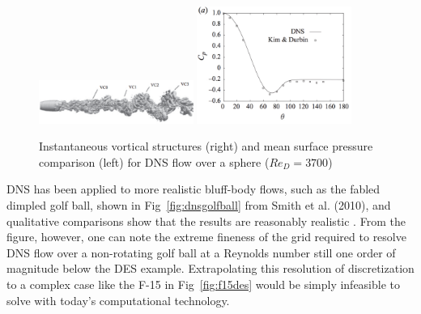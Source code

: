 \documentclass[journal]{new-aiaa}
\begin{document}
\begin{figure}[H]
\begin{center}
\includegraphics[width=0.45\textwidth]{Images/logan/rodriguez2011direct_DNSsphereWake.pdf}
\includegraphics[width=0.45\textwidth]{Images/logan/rodriguez2011direct_DNSsphereCp.pdf}
\caption{ Instantaneous vortical structures (right) and mean surface pressure comparison (left) for DNS flow over a sphere ($Re_D = 3700$) \cite{rodriguez2011direct} }
\label{fig:dnssphere}
\end{center}
\end{figure}


DNS has been applied to more realistic bluff-body flows, such as the fabled dimpled golf ball, shown in Fig~\ref{fig:dnsgolfball} from Smith et al. (2010), and qualitative comparisons show that the results are reasonably realistic \cite{smith2010numerical}. From the figure, however, one can note the extreme fineness of the grid required to resolve DNS flow over a non-rotating golf ball at a Reynolds number still one order of magnitude below the DES example. Extrapolating this resolution of discretization to a complex case like the F-15 in Fig~\ref{fig:f15des} would be simply infeasible to solve with today's computational technology.
\end{document}

